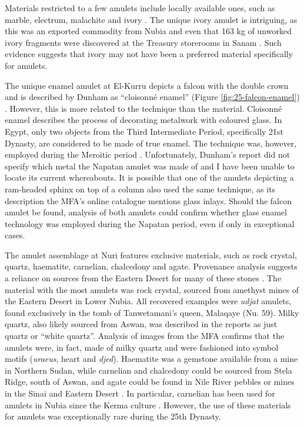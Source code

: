Materials restricted to a few amulets include locally available ones, such as marble, electrum, malachite and ivory \parencites[p.~927-929]{harrellArchaeologyGeologyAncient2024}. The unique ivory amulet is intriguing, as this was an exported commodity from Nubia and even that 163 kg of unworked ivory fragments were discovered at the Treasury storerooms in Sanam \parencites{griffithOxfordExcavationsNubia1922}[p.~128-130]{vincentelliLongDistanceTrade2018}{shochatThousandYearsNubian2025}. Such evidence suggests that ivory may not have been a preferred material specifically for amulets.


The unique enamel amulet at El-Kurru depicts a falcon with the double crown and is described by Dunham as “cloisonné enamel” (Figure \ref{fig:25-falcon-enamel}) \parencites[p.~93]{dunhamElKurru1950}. However, this is more related to the technique than the material. Cloisonné enamel describes the process of decorating metalwork with coloured glass. In Egypt, only two objects from the Third Intermediate Period, specifically 21st Dynasty, are considered to be made of true enamel. The technique was, however, employed during the Meroitic period \parencites[p.~166]{ogdenMetals2000}. Unfortunately, Dunham's report did not specify which metal the Napatan amulet was made of and I have been unable to locate its current whereabouts. It is possible that one of the amulets depicting a ram-headed sphinx on top of a column also used the same technique, as its description the MFA's online catalogue mentions glass inlays. Should the falcon amulet be found, analysis of both amulets could confirm whether glass enamel technology was employed during the Napatan period, even if only in exceptional cases.


The amulet assemblage at Nuri features exclusive materials, such as rock crystal, quartz, haematite, carnelian, chalcedony and agate. Provenance analysis suggests a reliance on sources from the Eastern Desert for many of these stones \parencites[p.~759]{harrellArchaeologyGeologyAncient2024}. The material with the most amulets was rock crystal, sourced from amethyst mines of the Eastern Desert in Lower Nubia. All recovered examples were \textit{udjat} amulets, found exclusively in the tomb of Tanwetamani's queen, Malaqaye (Nu. 59). Milky quartz, also likely sourced from Aswan, was described in the reports as just quartz or “white quartz”. Analysis of images from the MFA confirms that the amulets were, in fact, made of milky quartz and were fashioned into symbol motifs (\textit{uraeus}, heart and \textit{djed}). Haematite was a gemstone available from a mine in Northern Sudan, while carnelian and chalcedony could be sourced from Stela Ridge, south of Aswan, and agate could be found in Nile River pebbles or mines in the Sinai and Eastern Desert  \parencites[p.~759, 866, 948]{harrellArchaeologyGeologyAncient2024}. In particular, carnelian has been used for amulets in Nubia since the Kerma culture \parencites[p.~146]{minorUseEgyptianEgyptianizing2012}. However, the use of these materials for amulets was exceptionally rare during the 25th Dynasty.


